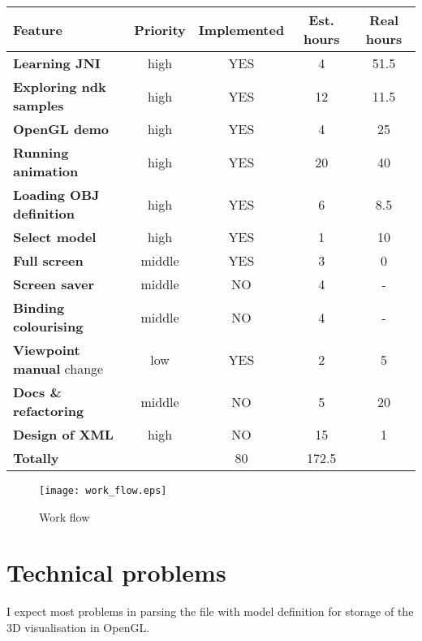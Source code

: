 \begin{tabular}{| l || c | c |  c | c |}
\hline
Feature & Priority & Implemented & Est. hours & Real hours\\
\hline
\hline
\textbf{Learning JNI} & high & YES &                 4 & 51.5\\
\textbf{Exploring ndk samples} & high & YES &       12 & 11.5\\
\textbf{OpenGL demo} & high & YES &                  4 & 25\\
\textbf{Running animation} & high & YES &           20 & 40\\
\textbf{Loading OBJ definition} & high & YES &       6 &  8.5\\
\textbf{Select model} & high & YES &                 1 & 10\\
\textbf{Full screen} & middle & YES &                3 &  0\\
\textbf{Screen saver} & middle & NO &                4 &  -\\
\textbf{Binding colourising} & middle & NO &         4 & -\\
\textbf{Viewpoint manual} change & low & YES &       2 & 5\\
\textbf{Docs \& refactoring} & middle & NO &         5 & 20\\
\textbf{Design of XML} & high & NO &                15 & 1\\
\hline
\textbf{Totally} & &                                80 & 172.5 \\
\hline
\end{tabular}

\begin{figure}
\texttt{[image: work\_flow.eps]}
\label{work_flow}
\caption{Work flow}
\end{figure}


\section*{Technical problems} %
\label{sec:Technical problems}
I expect most problems in parsing the file with model definition
for storage of the 3D visualisation in OpenGL.

